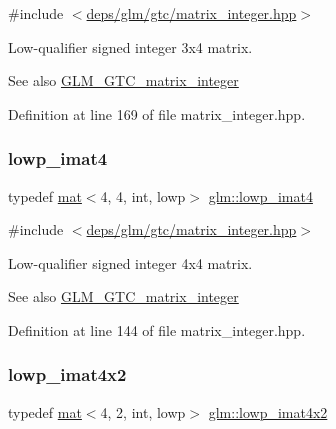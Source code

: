 {\ttfamily \#include $<$\hyperlink{matrix__integer_8hpp}{deps/glm/gtc/matrix\+\_\+integer.\+hpp}$>$}

Low-\/qualifier signed integer 3x4 matrix. \begin{DoxySeeAlso}{See also}
\hyperlink{group__gtc__matrix__integer}{G\+L\+M\+\_\+\+G\+T\+C\+\_\+matrix\+\_\+integer} 
\end{DoxySeeAlso}


Definition at line 169 of file matrix\+\_\+integer.\+hpp.

\mbox{\label{group__gtc__matrix__integer_gaf6a884d14be360b41dc26d59cd732be7}} 
\subsubsection{\texorpdfstring{lowp\+\_\+imat4}{lowp\_imat4}}
{\footnotesize\ttfamily typedef \hyperlink{structglm_1_1mat}{mat}$<$4, 4, int, lowp$>$ \hyperlink{group__gtc__matrix__integer_gaf6a884d14be360b41dc26d59cd732be7}{glm\+::lowp\+\_\+imat4}}



{\ttfamily \#include $<$\hyperlink{matrix__integer_8hpp}{deps/glm/gtc/matrix\+\_\+integer.\+hpp}$>$}

Low-\/qualifier signed integer 4x4 matrix. \begin{DoxySeeAlso}{See also}
\hyperlink{group__gtc__matrix__integer}{G\+L\+M\+\_\+\+G\+T\+C\+\_\+matrix\+\_\+integer} 
\end{DoxySeeAlso}


Definition at line 144 of file matrix\+\_\+integer.\+hpp.

\mbox{\label{group__gtc__matrix__integer_gad0e232eab19300176c21b9bc1bd7d247}} 
\subsubsection{\texorpdfstring{lowp\+\_\+imat4x2}{lowp\_imat4x2}}
{\footnotesize\ttfamily typedef \hyperlink{structglm_1_1mat}{mat}$<$4, 2, int, lowp$>$ \hyperlink{group__gtc__matrix__integer_gad0e232eab19300176c21b9bc1bd7d247}{glm\+::lowp\+\_\+imat4x2}}



